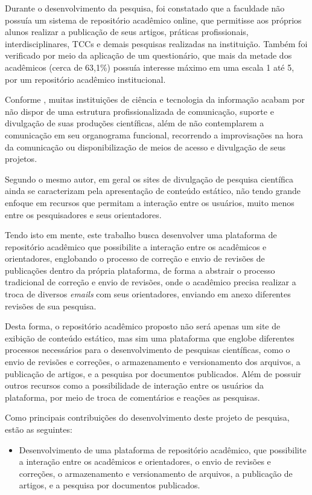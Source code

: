 Durante o desenvolvimento da pesquisa, foi constatado que a faculdade
não possuía um sistema de repositório acadêmico online, que permitisse aos
próprios alunos realizar a publicação de seus artigos, práticas profissionais,
interdisciplinares, TCCs e demais pesquisas realizadas na instituição.
Também foi verificado por meio da aplicação de um questionário, que
mais da metade dos acadêmicos (cerca de 63,1\%) possuía interesse máximo
em uma escala 1 até 5, por um repositório acadêmico institucional.

Conforme \citep[p. 15]{PORTO:difusao_cientifica_recortes}, muitas
instituições de ciência e tecnologia da informação acabam por não dispor
de uma estrutura profissionalizada de comunicação, suporte e divulgação
de suas produções científicas, além de não contemplarem a comunicação em seu
organograma funcional, recorrendo a improvisações na hora da comunicação
ou disponibilização de meios de acesso e divulgação de seus projetos.

Segundo o mesmo autor, em geral os sites de divulgação de pesquisa
científica ainda se caracterizam pela apresentação de conteúdo estático,
não tendo grande enfoque em recursos que permitam a interação entre os
usuários, muito menos entre os pesquisadores e seus orientadores.

Tendo isto em mente, este trabalho busca desenvolver uma plataforma de
repositório acadêmico que possibilite a interação entre os acadêmicos e
orientadores, englobando o processo de correção e envio de revisões de
publicações dentro da própria plataforma, de forma a abstrair o processo
tradicional de correção e envio de revisões, onde o acadêmico precisa
realizar a troca de diversos \emph{emails} com seus orientadores,
enviando em anexo diferentes revisões de sua pesquisa.

Desta forma, o repositório acadêmico proposto não será apenas um site
de exibição de conteúdo estático, mas sim uma plataforma que englobe
diferentes processos necessários para o desenvolvimento de pesquisas
científicas, como o envio de revisões e correções, o armazenamento
e versionamento dos arquivos, a publicação de artigos, e a pesquisa por
documentos publicados. Além de possuir outros recursos como a possibilidade
de interação entre os usuários da plataforma, por meio de troca de
comentários e reações as pesquisas.

Como principais contribuições do desenvolvimento deste projeto de
pesquisa, estão as seguintes:

\begin{itemize}
    \item Desenvolvimento de uma plataforma de repositório acadêmico,
          que possibilite a interação entre os acadêmicos e orientadores,
          o envio de revisões e correções, o armazenamento e versionamento
          de arquivos, a publicação de artigos, e a pesquisa por documentos
          publicados.
\end{itemize}


